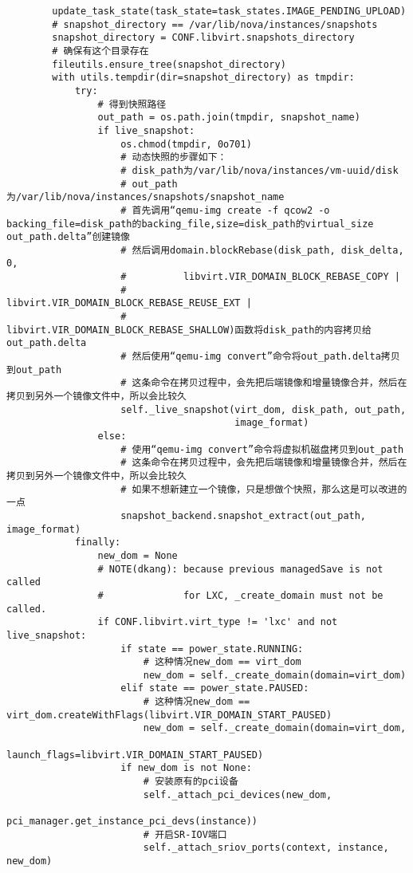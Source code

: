 \documentclass[a4paper,left=1.5cm,right=1.5cm,11pt]{article}
\begin{document}
\begin{lstlisting}
        update_task_state(task_state=task_states.IMAGE_PENDING_UPLOAD)
        # snapshot_directory == /var/lib/nova/instances/snapshots
        snapshot_directory = CONF.libvirt.snapshots_directory
        # 确保有这个目录存在
        fileutils.ensure_tree(snapshot_directory)
        with utils.tempdir(dir=snapshot_directory) as tmpdir:
            try:
                # 得到快照路径
                out_path = os.path.join(tmpdir, snapshot_name)
                if live_snapshot:
                    os.chmod(tmpdir, 0o701)
                    # 动态快照的步骤如下：
                    # disk_path为/var/lib/nova/instances/vm-uuid/disk
                    # out_path为/var/lib/nova/instances/snapshots/snapshot_name
                    # 首先调用“qemu-img create -f qcow2 -o backing_file=disk_path的backing_file,size=disk_path的virtual_size out_path.delta”创建镜像
                    # 然后调用domain.blockRebase(disk_path, disk_delta, 0,
                    #          libvirt.VIR_DOMAIN_BLOCK_REBASE_COPY |
                    #          libvirt.VIR_DOMAIN_BLOCK_REBASE_REUSE_EXT |
                    #          libvirt.VIR_DOMAIN_BLOCK_REBASE_SHALLOW)函数将disk_path的内容拷贝给out_path.delta
                    # 然后使用“qemu-img convert”命令将out_path.delta拷贝到out_path
                    # 这条命令在拷贝过程中，会先把后端镜像和增量镜像合并，然后在拷贝到另外一个镜像文件中，所以会比较久
                    self._live_snapshot(virt_dom, disk_path, out_path,
                                        image_format)
                else:
                    # 使用“qemu-img convert”命令将虚拟机磁盘拷贝到out_path
                    # 这条命令在拷贝过程中，会先把后端镜像和增量镜像合并，然后在拷贝到另外一个镜像文件中，所以会比较久
                    # 如果不想新建立一个镜像，只是想做个快照，那么这是可以改进的一点
                    snapshot_backend.snapshot_extract(out_path, image_format)
            finally:
                new_dom = None
                # NOTE(dkang): because previous managedSave is not called
                #              for LXC, _create_domain must not be called.
                if CONF.libvirt.virt_type != 'lxc' and not live_snapshot:
                    if state == power_state.RUNNING:
                        # 这种情况new_dom == virt_dom
                        new_dom = self._create_domain(domain=virt_dom)
                    elif state == power_state.PAUSED:
                        # 这种情况new_dom == virt_dom.createWithFlags(libvirt.VIR_DOMAIN_START_PAUSED)
                        new_dom = self._create_domain(domain=virt_dom,
                                launch_flags=libvirt.VIR_DOMAIN_START_PAUSED)
                    if new_dom is not None:
                        # 安装原有的pci设备
                        self._attach_pci_devices(new_dom,
                            pci_manager.get_instance_pci_devs(instance))
                        # 开启SR-IOV端口
                        self._attach_sriov_ports(context, instance, new_dom)


\end{lstlisting}
\end{document}
